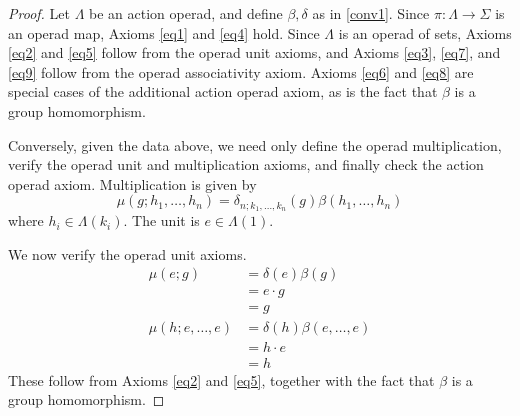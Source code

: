 \begin{proof}
Let $\Lambda$ be an action operad, and define $\beta, \delta$ as in \cref{conv1}. Since $\pi \colon \Lambda \rightarrow \Sigma$ is an operad map, Axioms \ref{eq1} and \ref{eq4} hold. Since $\Lambda$ is an operad of sets, Axioms \ref{eq2} and \ref{eq5} follow from the operad unit axioms, and Axioms \ref{eq3}, \ref{eq7}, and \ref{eq9} follow from the operad associativity axiom. Axioms \ref{eq6} and \ref{eq8} are special cases of the additional action operad axiom, as is the fact that $\beta$ is a group homomorphism.

Conversely, given the data above, we need only define the operad multiplication, verify the operad unit and multiplication axioms, and finally check the action operad axiom. Multiplication is given by
  \[
    \mu(g; h_{1}, \ldots, h_{n}) = \delta_{n; k_{1}, \ldots, k_{n}}(g) \beta(h_{1}, \ldots, h_{n})
  \]
where $h_{i} \in \Lambda(k_{i})$. The unit is $e \in \Lambda(1)$.

We now verify the operad unit axioms.
  \begin{align*}
    \mu(e; g) &= \delta(e)\beta(g) \\
    &= e \cdot g \\
    &= g \\
    \mu(h; e, \ldots, e) &= \delta(h)\beta(e, \ldots, e) \\
    &= h \cdot e \\
    &= h
  \end{align*}
These follow from Axioms \ref{eq2} and \ref{eq5}, together with the fact that $\beta$ is a group homomorphism.


\end{proof}
